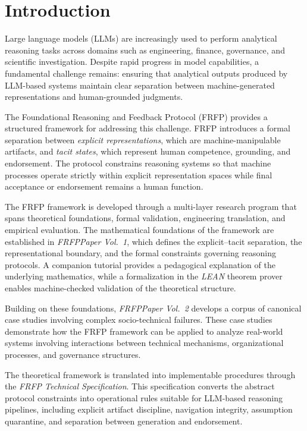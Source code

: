 \section{Introduction}

Large language models (LLMs) are increasingly used to perform analytical reasoning tasks across domains such as engineering, finance, governance, and scientific investigation. Despite rapid progress in model capabilities, a fundamental challenge remains: ensuring that analytical outputs produced by LLM-based systems maintain clear separation between machine-generated representations and human-grounded judgments.

The Foundational Reasoning and Feedback Protocol (FRFP) provides a structured framework for addressing this challenge. FRFP introduces a formal separation between \emph{explicit representations}, which are machine-manipulable artifacts, and \emph{tacit states}, which represent human competence, grounding, and endorsement. The protocol constrains reasoning systems so that machine processes operate strictly within explicit representation spaces while final acceptance or endorsement remains a human function.

The FRFP framework is developed through a multi-layer research program that spans theoretical foundations, formal validation, engineering translation, and empirical evaluation. The mathematical foundations of the framework are established in \emph{FRFPPaper Vol.~1}, which defines the explicit–tacit separation, the representational boundary, and the formal constraints governing reasoning protocols. A companion tutorial provides a pedagogical explanation of the underlying mathematics, while a formalization in the \emph{LEAN} theorem prover enables machine-checked validation of the theoretical structure.

Building on these foundations, \emph{FRFPPaper Vol.~2} develops a corpus of canonical case studies involving complex socio-technical failures. These case studies demonstrate how the FRFP framework can be applied to analyze real-world systems involving interactions between technical mechanisms, organizational processes, and governance structures.

The theoretical framework is translated into implementable procedures through the \emph{FRFP Technical Specification}. This specification converts the abstract protocol constraints into operational rules suitable for LLM-based reasoning pipelines, including explicit artifact discipline, navigation integrity, assumption quarantine, and separation between generation and endorsement.

